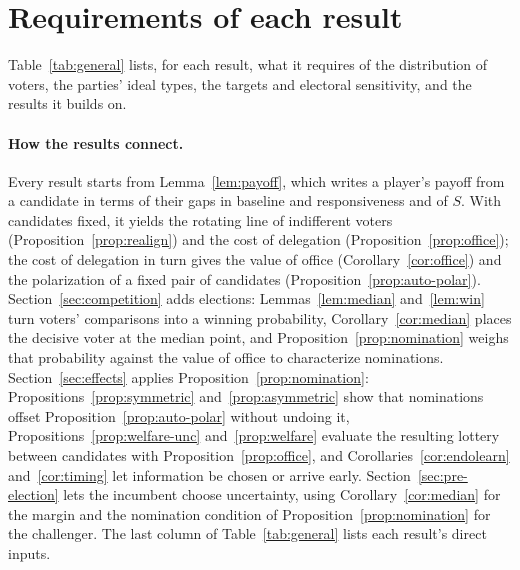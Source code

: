 \documentclass[12pt,letterpaper]{article}
\begin{document}
\section{Requirements of each result}\label{app:requirements}
Table~\ref{tab:general} lists, for each result, what it requires of the distribution of voters, the parties' ideal types, the targets and electoral sensitivity, and the results it builds on.

\paragraph{How the results connect.}
Every result starts from Lemma~\ref{lem:payoff}, which writes a player's payoff from a candidate in terms of their gaps in baseline and responsiveness and of $S$. With candidates fixed, it yields the rotating line of indifferent voters (Proposition~\ref{prop:realign}) and the cost of delegation (Proposition~\ref{prop:office}); the cost of delegation in turn gives the value of office (Corollary~\ref{cor:office}) and the polarization of a fixed pair of candidates (Proposition~\ref{prop:auto-polar}). Section~\ref{sec:competition} adds elections: Lemmas~\ref{lem:median} and~\ref{lem:win} turn voters' comparisons into a winning probability, Corollary~\ref{cor:median} places the decisive voter at the median point, and Proposition~\ref{prop:nomination} weighs that probability against the value of office to characterize nominations. Section~\ref{sec:effects} applies Proposition~\ref{prop:nomination}: Propositions~\ref{prop:symmetric} and~\ref{prop:asymmetric} show that nominations offset Proposition~\ref{prop:auto-polar} without undoing it, Propositions~\ref{prop:welfare-unc} and~\ref{prop:welfare} evaluate the resulting lottery between candidates with Proposition~\ref{prop:office}, and Corollaries~\ref{cor:endolearn} and~\ref{cor:timing} let information be chosen or arrive early. Section~\ref{sec:pre-election} lets the incumbent choose uncertainty, using Corollary~\ref{cor:median} for the margin and the nomination condition of Proposition~\ref{prop:nomination} for the challenger. The last column of Table~\ref{tab:general} lists each result's direct inputs.
\end{document}
